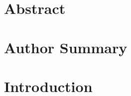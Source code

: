 \documentclass[10pt,letterpaper]{article}
\begin{document}
\section*{Abstract}



\section*{Author Summary}

\linenumbers

\section*{Introduction}


\end{document}
